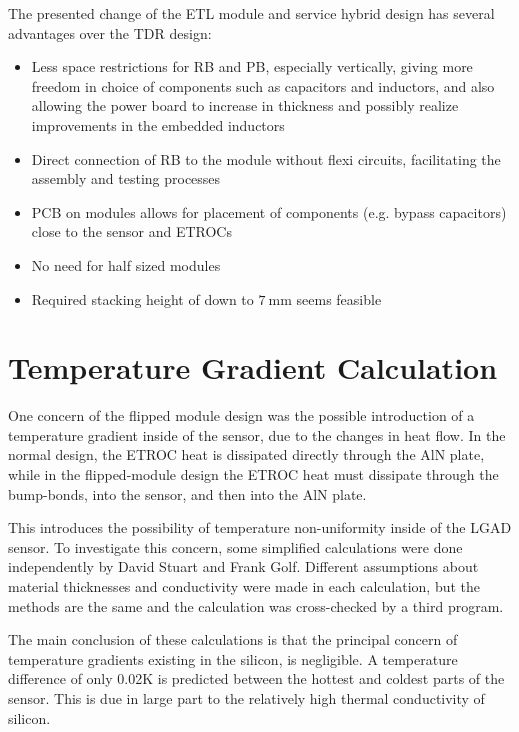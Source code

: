 \documentclass[11pt]{article}
\begin{document}
The presented change of the ETL module and service hybrid design has several advantages over the TDR design:
\begin{itemize}
  \item Less space restrictions for RB and PB, especially vertically, giving more freedom in choice of components such as capacitors and inductors, and also allowing the power board to increase in thickness and possibly realize improvements in the embedded inductors
  \item Direct connection of RB to the module without flexi circuits, facilitating the assembly and testing processes
  \item PCB on modules allows for placement of components (e.g. bypass capacitors) close to the sensor and ETROCs
  \item No need for half sized modules
  \item Required stacking height of down to $7~\mathrm{mm}$ seems feasible
\end{itemize}

\newpage
\appendix
\appendixpage
\addappheadtotoc

\section{Temperature Gradient Calculation}
\label{sec:temperature-calculation}

One concern of the flipped module design was the possible introduction of a temperature gradient inside of the sensor, due to the changes in heat flow.
In the normal design, the ETROC heat is dissipated directly through the AlN plate, while in the flipped-module design the ETROC heat must dissipate through the bump-bonds, into the sensor, and then into the AlN plate.

This introduces the possibility of temperature non-uniformity inside of the LGAD sensor.
To investigate this concern, some simplified calculations were done independently by David Stuart and Frank Golf.
Different assumptions about material thicknesses and conductivity were made in each calculation, but the methods are the same and the calculation was cross-checked by a third program.

The main conclusion of these calculations is that the principal concern of temperature gradients existing in the silicon, is negligible.
A temperature difference of only 0.02K is predicted between the hottest and coldest parts of the sensor.
This is due in large part to the relatively high thermal conductivity of silicon.
\end{document}
